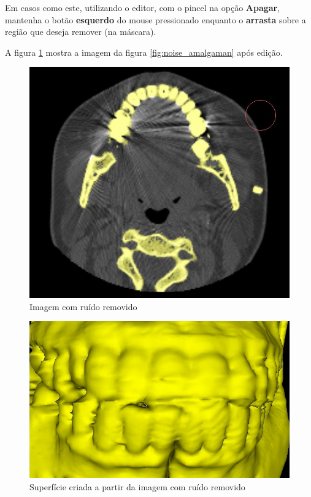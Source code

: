 Em casos como este, utilizando o editor, com o pincel na opção \textbf{Apagar}, mantenha o
botão \textbf{esquerdo} do mouse pressionado enquanto o \textbf{arrasta} sobre a região que
deseja remover (na máscara).

A figura \ref{fig:editor_amalgaman} mostra a imagem da figura \ref{fig:noise_amalgaman} após
edição.

\begin{figure}[!htb]
\centering
\includegraphics[scale=0.3]{../user_guide_figures/invesalius_screen/segmentation_manual_noise_amalgam_removed.jpg}
\caption{Imagem com ruído removido}
\label{fig:editor_amalgaman}
\end{figure}

\begin{figure}[!htb]
\centering
\includegraphics[scale=0.3]{../user_guide_figures/invesalius_screen/segmentation_manual_noise_amalgam_removed_3d_zoom.jpg}
\caption{Superfície criada a partir da imagem com ruído removido}
\label{fig:surface_edited_amalgaman}
\end{figure}

